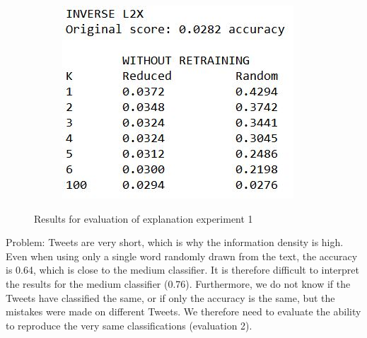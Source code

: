 {\begin{figure}[H]
\begin{subfigure}[b]{0.4\textwidth}
		\includegraphics[width=\textwidth]{img/expleval1_invL2X.JPG}
	\end{subfigure}
	\caption{Results for evaluation of explanation experiment 1}
	\label{fig:results_expleval1}
\end{figure}
Problem: Tweets are very short, which is why the information density is high. Even when using only a single word randomly drawn from the text, the accuracy is 0.64, which is close to the medium classifier. It is therefore difficult to interpret the results for the medium classifier (0.76). Furthermore, we do not know if the Tweets have classified the same, or if only the accuracy is the same, but the mistakes were made on different Tweets. We therefore need to evaluate the ability to reproduce the very same classifications (evaluation 2).


}
